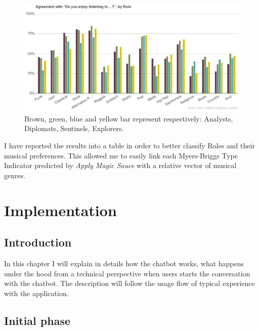 \documentclass[b5paper,10pt,twoside,cucitura]{toptesi}
\begin{document}
\begin{figure}[ht]
\centering
\includegraphics[scale=0.5]{survey_histogram.png}
\caption{Brown, green, blue and yellow bar represent respectively: Analysts, Diplomats, Sentinels, Explorers.}
\end{figure}

I have reported the results into a table in order to better classify Roles and their musical preferences. This allowed me to easily link each Myers-Briggs Type Indicator predicted by \textit{Apply Magic Sauce} with a relative vector of musical genres. 


\chapter{Implementation}

\section{Introduction}

In this chapter I will explain in details how the chatbot works, what happens under the hood from a technical perspective when users starts the conversation with the chatbot. The description will follow the usage flow of typical experience with the application.

\section{Initial phase}
\end{document}

